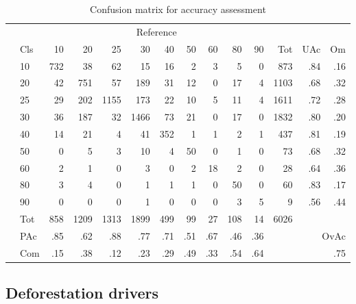 		\begin{table}[ht]
			\centering
			\caption[Accuracy assessment]{Confusion matrix for accuracy assessment}
			\label{tab:accuracy}
			\begin{tabular}{ll|rrrrrrrrr|rrr}
				& & \multicolumn{9}{c|}{Reference} & & & \\
				& Cls & 10 & 20 & 25 & 30 & 40 & 50 & 60 & 80 & 90 & Tot & UAc & Om \\\hline
				\multirow{9}{*}{\STAB{\rotatebox[origin=c]{90}{Prediction}}}
				& 10 & 732 & 38 & 62 & 15 & 16 & 2 & 3 & 5 & 0 & 873 & .84 & .16 \\ 
				& 20 & 42 & 751 & 57 & 189 & 31 & 12 & 0 & 17 & 4 & 1103 & .68 & .32 \\ 
				& 25 & 29 & 202 & 1155 & 173 & 22 & 10 & 5 & 11 & 4 & 1611 & .72 & .28 \\ 
				& 30 & 36 & 187 & 32 & 1466 & 73 & 21 & 0 & 17 & 0 & 1832 & .80 & .20 \\ 
				& 40 & 14 & 21 & 4 & 41 & 352 & 1 & 1 & 2 & 1 & 437 & .81 & .19 \\ 
				& 50 & 0 & 5 & 3 & 10 & 4 & 50 & 0 & 1 & 0 & 73 & .68 & .32 \\ 
				& 60 & 2 & 1 & 0 & 3 & 0 & 2 & 18 & 2 & 0 & 28 & .64 & .36 \\ 
				& 80 & 3 & 4 & 0 & 1 & 1 & 1 & 0 & 50 & 0 & 60 & .83 & .17 \\ 
				& 90 & 0 & 0 & 0 & 1 & 0 & 0 & 0 & 3 & 5 & 9 & .56 & .44 \\\hline 
				& Tot & 858 & 1209 & 1313 & 1899 & 499 & 99 & 27 & 108 & 14 & 6026 & & \\
				& PAc & .85 & .62 & .88 & .77 & .71 & .51 & .67 & .46 & .36 & & \multicolumn{2}{r}{OvAc} \\
				& Com & .15 & .38 & .12 & .23 & .29 & .49 & .33 & .54 & .64 & & \multicolumn{2}{r}{.75} \\ 
			\end{tabular}
		\end{table}

\newpage

	\subsection{Deforestation drivers}
	\label{subsec:driver}


